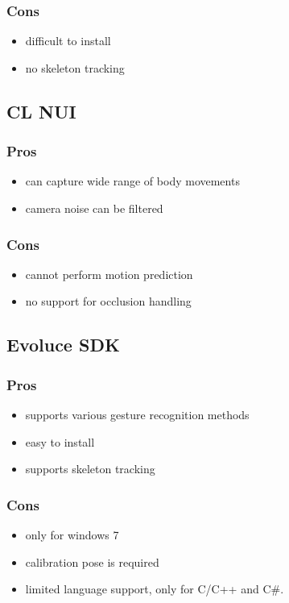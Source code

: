 \documentclass[a4paper,10pt]{report}
\begin{document}
\subsubsection{Cons}
\begin{itemize}
 \item difficult to install
 \item no skeleton tracking
\end{itemize}

\subsection{CL NUI}
\subsubsection{Pros}
\begin{itemize}
 \item can capture wide range of body movements
 \item camera noise can be filtered
\end{itemize}
\subsubsection{Cons}
\begin{itemize}
 \item cannot perform motion prediction
 \item no support for occlusion handling
\end{itemize}

\subsection{Evoluce SDK}
\subsubsection{Pros}
\begin{itemize}
 \item supports various gesture recognition methods
 \item easy to install
 \item supports skeleton tracking
\end{itemize}
\subsubsection{Cons}
\begin{itemize}
 \item only for windows 7
 \item calibration pose is required
 \item limited language support, only for C/C++ and C#.
\end{itemize}
\end{document}
